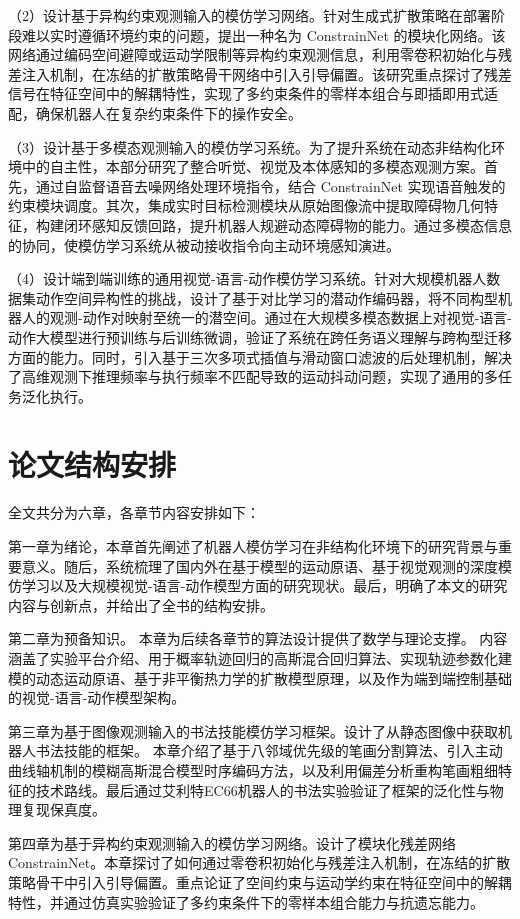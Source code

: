 （2）设计基于异构约束观测输入的模仿学习网络。针对生成式扩散策略在部署阶段难以实时遵循环境约束的问题，提出一种名为 ConstrainNet 的模块化网络。该网络通过编码空间避障或运动学限制等异构约束观测信息，利用零卷积初始化与残差注入机制，在冻结的扩散策略骨干网络中引入引导偏置。该研究重点探讨了残差信号在特征空间中的解耦特性，实现了多约束条件的零样本组合与即插即用式适配，确保机器人在复杂约束条件下的操作安全。

（3）设计基于多模态观测输入的模仿学习系统。为了提升系统在动态非结构化环境中的自主性，本部分研究了整合听觉、视觉及本体感知的多模态观测方案。首先，通过自监督语音去噪网络处理环境指令，结合 ConstrainNet 实现语音触发的约束模块调度。其次，集成实时目标检测模块从原始图像流中提取障碍物几何特征，构建闭环感知反馈回路，提升机器人规避动态障碍物的能力。通过多模态信息的协同，使模仿学习系统从被动接收指令向主动环境感知演进。

（4）设计端到端训练的通用视觉-语言-动作模仿学习系统。针对大规模机器人数据集动作空间异构性的挑战，设计了基于对比学习的潜动作编码器，将不同构型机器人的观测-动作对映射至统一的潜空间。通过在大规模多模态数据上对视觉-语言-动作大模型进行预训练与后训练微调，验证了系统在跨任务语义理解与跨构型迁移方面的能力。同时，引入基于三次多项式插值与滑动窗口滤波的后处理机制，解决了高维观测下推理频率与执行频率不匹配导致的运动抖动问题，实现了通用的多任务泛化执行。

\section{论文结构安排}
全文共分为六章，各章节内容安排如下：

第一章为绪论，本章首先阐述了机器人模仿学习在非结构化环境下的研究背景与重要意义。随后，系统梳理了国内外在基于模型的运动原语、基于视觉观测的深度模仿学习以及大规模视觉-语言-动作模型方面的研究现状。最后，明确了本文的研究内容与创新点，并给出了全书的结构安排。

第二章为预备知识。 本章为后续各章节的算法设计提供了数学与理论支撑。 内容涵盖了实验平台介绍、用于概率轨迹回归的高斯混合回归算法、实现轨迹参数化建模的动态运动原语、基于非平衡热力学的扩散模型原理，以及作为端到端控制基础的视觉-语言-动作模型架构。

第三章为基于图像观测输入的书法技能模仿学习框架。设计了从静态图像中获取机器人书法技能的框架。 本章介绍了基于八邻域优先级的笔画分割算法、引入主动曲线轴机制的模糊高斯混合模型时序编码方法，以及利用偏差分析重构笔画粗细特征的技术路线。最后通过艾利特EC66机器人的书法实验验证了框架的泛化性与物理复现保真度。

第四章为基于异构约束观测输入的模仿学习网络。设计了模块化残差网络 ConstrainNet。本章探讨了如何通过零卷积初始化与残差注入机制，在冻结的扩散策略骨干中引入引导偏置。重点论证了空间约束与运动学约束在特征空间中的解耦特性，并通过仿真实验验证了多约束条件下的零样本组合能力与抗遗忘能力。

